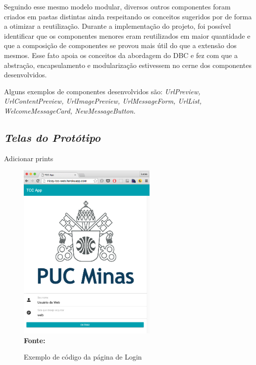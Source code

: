Seguindo esse mesmo modelo modular, diversos outros componentes foram criados em pastas distintas ainda respeitando os conceitos sugeridos por \cite{presentContainerAbramov} de forma a otimizar a reutilização. Durante a implementação do projeto, foi possível identificar que os componentes menores eram reutilizados em maior quantidade e que a composição de componentes se provou mais útil do que a extensão dos mesmos. Esse fato apoia os conceitos da abordagem do DBC e fez com que a abstração, encapsulamento e modularização estivessem no cerne dos componentes desenvolvidos.

Alguns exemplos de componentes desenvolvidos são: \textit{UrlPreview, UrlContentPreview, UrlImagePreview, UrlMessageForm, UrlList, WelcomeMessageCard, NewMessageButton.}

\subsection{{\it Telas do Protótipo}}
Adicionar prints

\begin{figure}[ht]
	\centering	
	\caption[\hspace{0.1cm}Exemplo de código da página de Login.]{Exemplo de código da página de Login}
	\vspace{-0.4cm}
	\includegraphics[width=0.6\textwidth]{figuras/ExemploTela.png}
	\vspace{-0.2cm}
	\\\textbf{\footnotesize Fonte: \cite{pressman2011} }
	\label{fig:figura3}
\end{figure}
\vspace{-0.5cm}

